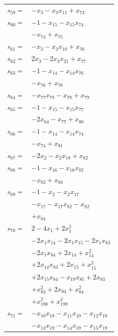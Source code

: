 \begin{longtable}{@{}r@{\;}l@{}}
\(s_{59}=\) & \(\displaystyle -x_{3} -x_{3}x_{11} +x_{74}\) \\[3pt]
\(s_{60}=\) & \(\displaystyle -1 -x_{15} -x_{15}x_{74}\) \\
 & \(\displaystyle -x_{74} +x_{75}\) \\[3pt]
\(s_{61}=\) & \(\displaystyle -x_{3} -x_{3}x_{10} +x_{76}\) \\[3pt]
\(s_{62}=\) & \(\displaystyle 2x_{3} -2x_{3}x_{21} +x_{77}\) \\[3pt]
\(s_{63}=\) & \(\displaystyle -1 -x_{14} -x_{14}x_{76}\) \\
 & \(\displaystyle -x_{76} +x_{78}\) \\[3pt]
\(s_{64}=\) & \(\displaystyle -x_{77}x_{78} -x_{78} +x_{79}\) \\[3pt]
\(s_{65}=\) & \(\displaystyle -1 -x_{15} -x_{15}x_{77}\) \\
 & \(\displaystyle -2x_{64} -x_{77} +x_{80}\) \\[3pt]
\(s_{66}=\) & \(\displaystyle -1 -x_{14} -x_{14}x_{74}\) \\
 & \(\displaystyle -x_{74} +x_{81}\) \\[3pt]
\(s_{67}=\) & \(\displaystyle -2x_{2} -x_{2}x_{18} +x_{82}\) \\[3pt]
\(s_{68}=\) & \(\displaystyle -1 -x_{16} -x_{16}x_{82}\) \\
 & \(\displaystyle -x_{82} +x_{83}\) \\[3pt]
\(s_{69}=\) & \(\displaystyle -1 -x_{2} -x_{2}x_{17}\) \\
 & \(\displaystyle -x_{17} -x_{17}x_{82} -x_{82}\) \\
 & \(\displaystyle +x_{84}\) \\[3pt]
\(s_{70}=\) & \(\displaystyle 2 -4x_{1} +2x_{1}^{2}\) \\
 & \(\displaystyle -2x_{1}x_{14} -2x_{1}x_{15} -2x_{1}x_{83}\) \\
 & \(\displaystyle -2x_{1}x_{84} +2x_{14} +x_{14}^{2}\) \\
 & \(\displaystyle +2x_{14}x_{83} +2x_{15} +x_{15}^{2}\) \\
 & \(\displaystyle +2x_{15}x_{84} -x_{19}x_{85} +2x_{83}\) \\
 & \(\displaystyle +x_{83}^{2} +2x_{84} +x_{84}^{2}\) \\
 & \(\displaystyle +x_{198}^{2} +x_{199}^{2}\) \\[3pt]
\(s_{71}=\) & \(\displaystyle -x_{10}x_{19} -x_{11}x_{19} -x_{12}x_{19}\) \\
 & \(\displaystyle -x_{13}x_{19} -x_{14}x_{19} -x_{15}x_{19}\) \\

\end{longtable}

